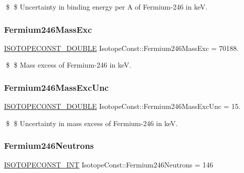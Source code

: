 \$ \$ Uncertainty in binding energy per A of Fermium-\/246 in keV. \mbox{\label{group___isotope_const-_fermium-_fm246_gaa5d056477860106f12aacad3d988c402}} 
\subsubsection{\texorpdfstring{Fermium246\+Mass\+Exc}{Fermium246MassExc}}
{\footnotesize\ttfamily \mbox{\hyperlink{group___isotope_const-_macros_ga8f45a7272ce02c0b4c65c44636ed719a}{I\+S\+O\+T\+O\+P\+E\+C\+O\+N\+S\+T\+\_\+\+D\+O\+U\+B\+LE}} Isotope\+Const\+::\+Fermium246\+Mass\+Exc = 70188.}

\$ \$ Mass excess of Fermium-\/246 in keV. \mbox{\label{group___isotope_const-_fermium-_fm246_ga9bc4e0f5dca55a0f1b1cc10fb8389759}} 
\subsubsection{\texorpdfstring{Fermium246\+Mass\+Exc\+Unc}{Fermium246MassExcUnc}}
{\footnotesize\ttfamily \mbox{\hyperlink{group___isotope_const-_macros_ga8f45a7272ce02c0b4c65c44636ed719a}{I\+S\+O\+T\+O\+P\+E\+C\+O\+N\+S\+T\+\_\+\+D\+O\+U\+B\+LE}} Isotope\+Const\+::\+Fermium246\+Mass\+Exc\+Unc = 15.}

\$ \$ Uncertainty in mass excess of Fermium-\/246 in keV. \mbox{\label{group___isotope_const-_fermium-_fm246_gab52c58f403af0334c850b33e5f3396a6}} 
\subsubsection{\texorpdfstring{Fermium246\+Neutrons}{Fermium246Neutrons}}
{\footnotesize\ttfamily \mbox{\hyperlink{group___isotope_const-_macros_ga5f18360b3e99483a35c32d789e62621c}{I\+S\+O\+T\+O\+P\+E\+C\+O\+N\+S\+T\+\_\+\+I\+NT}} Isotope\+Const\+::\+Fermium246\+Neutrons = 146}


